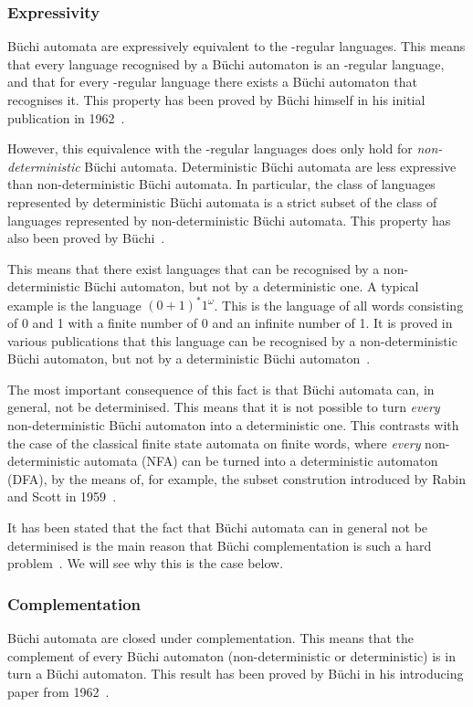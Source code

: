 \subsubsection{Expressivity}
Büchi automata are expressively equivalent to the \om-regular languages. This means that every language recognised by a Büchi automaton is an \om-regular language, and that for every \om-regular language there exists a Büchi automaton that recognises it. This property has been proved by Büchi himself in his initial publication in 1962~\cite{buchi1960decision}.

However, this equivalence with the \om-regular languages does only hold for \textit{non-deterministic} Büchi automata. Deterministic Büchi automata are less expressive than non-deterministic Büchi automata. In particular, the class of languages represented by deterministic Büchi automata is a strict subset of the class of languages represented by non-deterministic Büchi automata. This property has also been proved by Büchi~\cite{buchi1960decision}.

This means that there exist languages that can be recognised by a non-deterministic Büchi automaton, but not by a deterministic one. A typical example is the language $(0+1)^*1^\omega$. This is the language of all words consisting of 0 and 1 with a finite number of 0 and an infinite number of 1. It is proved in various publications that this language can be recognised by a non-deterministic Büchi automaton, but not by a deterministic Büchi automaton~\cite{1996_vardi}\cite{2002_roggenbach}.

The most important consequence of this fact is that Büchi automata can, in general, not be determinised. This means that it is not possible to turn \textit{every} non-deterministic Büchi automaton into a deterministic one. This contrasts with the case of the classical finite state automata on finite words, where \textit{every} non-deterministic automata (NFA) can be turned into a deterministic automaton (DFA), by the means of, for example, the subset constrution introduced by Rabin and Scott in 1959~\cite{1959_rabin}.

It has been stated that the fact that Büchi automata can in general not be determinised is the main reason that Büchi complementation is such a hard problem~\cite{niessner1997deterministic}. We will see why this is the case below.


\subsubsection{Complementation}
Büchi automata are closed under complementation. This means that the complement of every Büchi automaton (non-deterministic or deterministic) is in turn a Büchi automaton. This result has been proved by Büchi in his introducing paper from 1962~\cite{buchi1960decision}.

